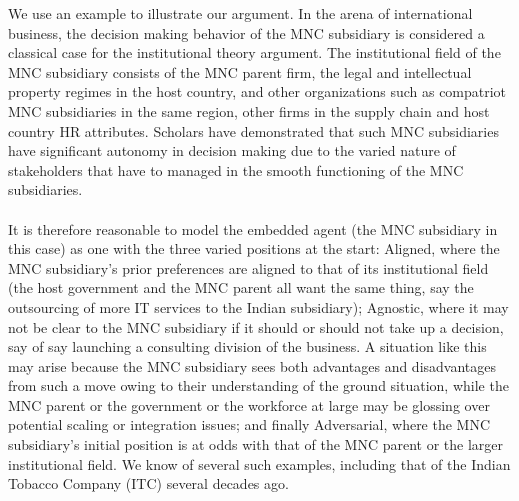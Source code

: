 \documentclass[12pt,letterpaper]{article}
\begin{document}
\noindent We use an example to illustrate our argument. In the arena of international business, the decision making behavior of the MNC subsidiary is considered a classical case for the institutional theory argument. The institutional field of the MNC subsidiary consists of the MNC parent firm, the legal and intellectual property regimes in the host country, and other organizations such as compatriot MNC subsidiaries in the same region, other firms in the supply chain and host country HR attributes. Scholars have demonstrated that such MNC subsidiaries have significant autonomy in decision making due to the varied nature of stakeholders that have to managed in the smooth functioning of the MNC subsidiaries. \\\\
It is therefore reasonable to model the embedded agent (the MNC subsidiary in this case) as one with the three varied positions at the start: Aligned, where the MNC subsidiary's prior preferences are aligned to that of its institutional field (the host government and the MNC parent all want the same thing, say the outsourcing of more IT services to the Indian subsidiary); Agnostic, where it may not be clear to the MNC subsidiary if it should or should not take up a decision, say of say launching a consulting division of the business. A situation like this may arise because the MNC subsidiary sees both advantages and disadvantages from such a move owing to their understanding of the ground situation, while the MNC parent or the government or the workforce at large may be glossing over potential scaling or integration issues; and finally Adversarial, where the MNC subsidiary's initial position is at odds with that of the MNC parent or the larger institutional field. We know of several such examples, including that of the Indian Tobacco Company (ITC) several decades ago. \\\\
\end{document}
